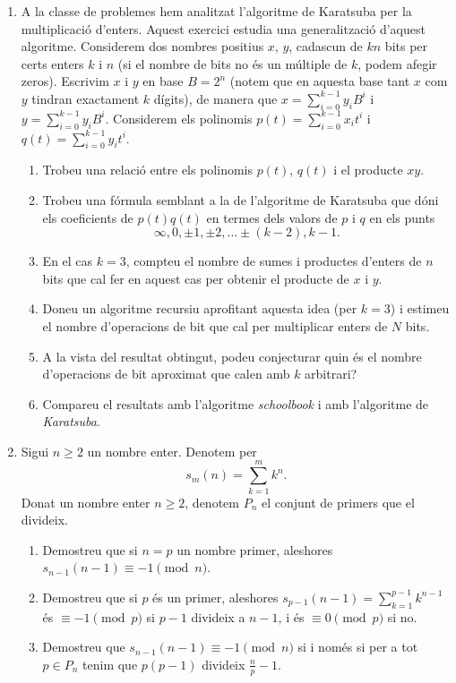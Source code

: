 \begin{enumerate}[leftmargin=*]
\item  A la classe de problemes hem analitzat l'algoritme de
Karatsuba per la multiplicació d'enters. Aquest exercici estudia una
generalització d'aquest algoritme. Considerem dos nombres positius
$x$, $y$, cadascun de $kn$ bits per certs enters $k$ i $n$ (si el
nombre de bits no és un múltiple de $k$, podem afegir zeros).
Escrivim $x$ i $y$ en base $B = 2^n$ (notem que en aquesta base tant
$x$ com $y$ tindran exactament $k$ dígits), de manera que
$x=\sum_{i=0}^{k-1} y_i B^i$ i $y=\sum_{i=0}^{k-1} y_iB^i$.
Considerem els polinomis $p(t)=\sum_{i=0}^{k-1}x_it^i$ i
$q(t)=\sum_{i=0}^{k-1}y_it^i$.
  \begin{enumerate}
  \item Trobeu una relació entre els polinomis $p(t)$, $q(t)$ i el producte $xy$.
  \item Trobeu una fórmula semblant a la de l'algoritme de Karatsuba que dóni els coeficients de $p(t)q(t)$ en termes dels valors de $p$ i $q$ en els punts
    \[
      \infty, 0, \pm 1, \pm 2,\ldots \pm (k-2), k-1.
    \]
  \item En el cas $k=3$, compteu el nombre de sumes i productes d'enters de $n$ bits que cal fer en aquest cas per obtenir el producte de $x$ i $y$.
  \item Doneu un algoritme recursiu aprofitant aquesta idea (per $k=3$) i estimeu el nombre d'operacions de bit que cal per multiplicar enters de $N$ bits.
  \item A la vista del resultat obtingut, podeu conjecturar quin és el nombre d'operacions de bit aproximat que calen amb $k$ arbitrari?
  \item Compareu el resultats amb l'algoritme \emph{schoolbook} i amb l'algoritme de \emph{Karatsuba}.
  \end{enumerate}

\item  Sigui $n\ge 2$ un nombre enter. Denotem per
$$s_m(n)=\sum_{k=1}^{m} k^{n}.$$ Donat un nombre enter
$n\ge 2$, denotem $P_n$ el conjunt de primers que el divideix.
\begin{enumerate}
\item Demostreu que si $n=p$ un nombre primer, aleshores $s_{n-1}(n-1)\equiv
-1 \pmod{n}$.
\item Demostreu que si $p$ és un primer, aleshores $s_{p-1}(n-1)=\sum_{k=1}^{p-1}
k^{n-1}$ és $\equiv -1\pmod{p}$ si $p-1$ divideix a $n-1$, i és
$\equiv 0\pmod{p}$ si no.
\item Demostreu que $s_{n-1}(n-1)\equiv -1 \pmod{n}$ si i només si per a tot
$p\in P_n$ tenim que $p(p-1)$ divideix $\frac np -1$. 


\end{enumerate}
\end{enumerate}
